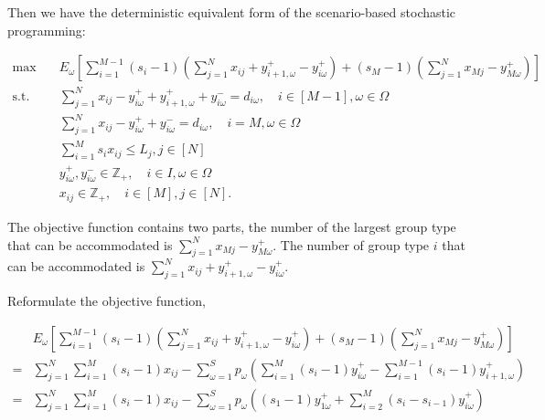 


Then we have the deterministic equivalent form of the scenario-based stochastic programming:

\begin{equation}\label{sto_form}
    \begin{aligned}
    \max \quad & E_{\omega}\left[\sum_{i=1}^{M-1} (s_i-1) (\sum_{j= 1}^{N} x_{ij} + y_{i+1,\omega}^{+} - y_{i \omega}^{+}) + (s_M-1) (\sum_{j= 1}^{N} x_{Mj} - y_{M \omega}^{+})\right] \\
    \text {s.t.} \quad & \sum_{j= 1}^{N} x_{ij}-y_{i \omega}^{+}+
    y_{i+1, \omega}^{+} + y_{i \omega}^{-}=d_{i \omega}, \quad i \in [M-1], \omega \in \Omega \\
    & \sum_{j= 1}^{N} x_{ij} -y_{i \omega}^{+}+y_{i \omega}^{-}=d_{i \omega}, \quad i = M, \omega \in \Omega \\
    & \sum_{i=1}^{M} s_{i} x_{ij} \leq L_j, j \in [N]\\
    & y_{i \omega}^{+}, y_{i \omega}^{-} \in \mathbb{Z}_{+}, \quad i \in I, \omega \in \Omega \\
    & x_{ij} \in \mathbb{Z}_{+}, \quad i \in [M], j \in [N].
    \end{aligned}
  \end{equation}


The objective function contains two parts, the number of the largest group type that can be accommodated is $\sum_{j= 1}^{N} x_{Mj} - y_{M \omega}^{+}$. The number of group type $i$ that can be accommodated is $\sum_{j= 1}^{N} x_{ij} + y_{i+1,\omega}^{+} - y_{i \omega}^{+}$.


Reformulate the objective function,

\begin{align*}
  & E_{\omega}\left[\sum_{i=1}^{M-1} (s_i-1) (\sum_{j= 1}^{N} x_{ij} + y_{i+1,\omega}^{+} - y_{i \omega}^{+}) + (s_M-1) (\sum_{j= 1}^{N} x_{Mj} - y_{M \omega}^{+})\right] \\
  =& \sum_{j =1}^{N} \sum_{i=1}^M (s_i-1) x_{ij} - \sum_{\omega =1}^{S} p_{\omega} \left(\sum_{i=1}^{M}(s_i-1)y_{i \omega}^{+} - \sum_{i=1}^{M-1}(s_i-1)y_{i+1, \omega}^{+}\right) \\
  =& \sum_{j =1}^{N} \sum_{i=1}^M (s_i-1) x_{ij} - \sum_{\omega =1}^{S} p_{\omega} \left((s_1-1)y_{1 \omega}^{+} + \sum_{i=2}^{M}(s_{i}-s_{i-1}) y_{i \omega}^{+} \right)
\end{align*}



